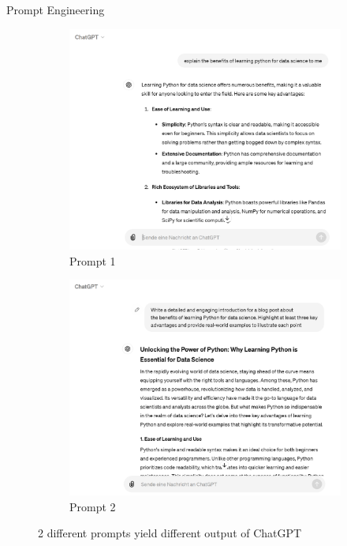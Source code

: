 \documentclass[t]{beamer}
\begin{document}
\begin{frame}{Prompt Engineering}
  \begin{figure}[htbp]
    \centering
    \begin{subfigure}[b]{0.42\textwidth}
        \centering
        \includegraphics[width=\textwidth]{prompt_ds_1.PNG}
        \caption{Prompt 1}
        \label{fig:prompt1}
    \end{subfigure}
    \hfill
    \begin{subfigure}[b]{0.42\textwidth}
        \centering
        \includegraphics[width=\textwidth]{prompt_ds_2.PNG}
        \caption{Prompt 2}
        \label{fig:prompt2}
    \end{subfigure}
    \caption{2 different prompts yield different output of ChatGPT}
    \label{fig:both_prompts}
  \end{figure}
\end{frame}
\end{document}
